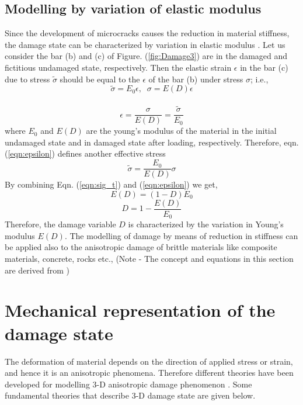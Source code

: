 \documentclass[12pt,openright,twoside]{report}
\begin{document}
\subsection{Modelling by variation of elastic modulus} 
\indent\indent\indent Since the development of microcracks causes the reduction in material stiffness, the damage state can be characterized by variation in elastic modulus \citep{lemaitre1978aspect}. Let us consider the bar (b) and (c) of Figure. (\ref{fig:Damage3}) are in the damaged and fictitious undamaged state, respectively. Then the elastic strain $\epsilon$ in the bar (c) due to stress $\tilde{\sigma}$ should be equal to the $\epsilon$ of the bar (b) under stress $\sigma$; i.e.,\\
\begin{equation}
\label{eqn:sig_t2}
   \tilde{\sigma} = E_{0}\epsilon, \;\;  \sigma = E(D)\epsilon 
\end{equation}
\\
\begin{equation}
\label{eqn:epsilon}
\epsilon = \frac{\sigma}{E(D)} = \frac{\tilde{\sigma}}{E_{0}}
\end{equation}
where $E_{0}$ and $E(D)$ are the young's modulus of the material in the initial undamaged state and in damaged state after loading, respectively. Therefore, eqn. (\ref{eqn:epsilon}) defines another effective stress\\
\begin{equation}
\label{eqn:epsilon2}
  \tilde{\sigma} = \frac{E_{0}}{E(D)}\sigma
\end{equation}
By combining Eqn. (\ref{eqn:sig_t}) and (\ref{eqn:epsilon}) we get,
\begin{equation}
\label{eqn:E(d)}
E(D) = (1 - D) E_{0}
\end{equation}
\begin{equation}
\label{eqn:D2}
D  = 1 - \frac{E(D)}{E_{0}}
\end{equation}
Therefore, the damage variable $D$ is characterized by the variation in Young's modulus $E(D)$. The modelling of damage by means of reduction in stiffness can be applied also to the anisotropic damage of brittle materials like composite materials, concrete, rocks etc., (Note - The concept and equations in this section are derived from \citep{murakami2012continuum})


\section{Mechanical representation of the damage state}
\indent\indent\indent The deformation of material depends on the direction of applied stress or strain, and hence it is an anisotropic phenomena. Therefore different theories have been developed for modelling 3-D anisotropic damage phenomenon \citep{murakami2012continuum}. Some fundamental theories that describe 3-D damage state are given below. 
\end{document}
